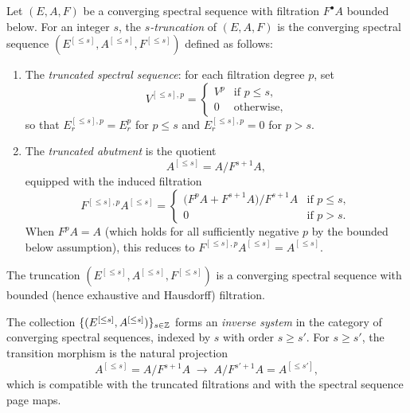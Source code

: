 \begin{definition}\label{prereq:def:truncated-ss}
    Let $(E, A, F)$ be a converging spectral sequence with filtration $F^\bullet A$ bounded below. For an integer $s$, the \emph{$s$-truncation} of $(E, A, F)$ is the converging spectral sequence $(E^{[\le s]}, A^{[\le s]}, F^{[\le s]})$ defined as follows:
    \begin{enumerate}
        \item The \emph{truncated spectral sequence}: for each filtration degree $p$, set
        $$V^{[\le s],p} = \begin{cases} V^p & \text{if } p \le s, \\ 0 & \text{otherwise,} \end{cases}$$
        so that $E_r^{[\le s],p} = E_r^p$ for $p \le s$ and $E_r^{[\le s],p} = 0$ for $p > s$.
        \item The \emph{truncated abutment} is the quotient
        $$A^{[\le s]} = A \big/ F^{s+1} A,$$
        equipped with the induced filtration
        $$F^{[\le s],p} A^{[\le s]} = \begin{cases} \big(F^p A + F^{s+1} A\big) \big/ F^{s+1} A & \text{if } p \le s, \\ 0 & \text{if } p > s. \end{cases}$$
        When $F^p A = A$ (which holds for all sufficiently negative $p$ by the bounded below assumption), this reduces to $F^{[\le s],p} A^{[\le s]} = A^{[\le s]}$.
    \end{enumerate}
    The truncation $(E^{[\le s]}, A^{[\le s]}, F^{[\le s]})$ is a converging spectral sequence with bounded (hence exhaustive and Hausdorff) filtration.
\end{definition}

\begin{proposition}\label{prereq:prop:truncations-inverse-system}
    The collection $\{(E^{[\le s]}, A^{[\le s]})\}_{s \in {\mathbb Z}}$ forms an \emph{inverse system} in the category of converging spectral sequences, indexed by $s$ with order $s \ge s'$. For $s \ge s'$, the transition morphism is the natural projection
    $$A^{[\le s]} = A \big/ F^{s+1} A \;\longrightarrow\; A \big/ F^{s'+1} A = A^{[\le s']},$$
    which is compatible with the truncated filtrations and with the spectral sequence page maps.
\end{proposition}

